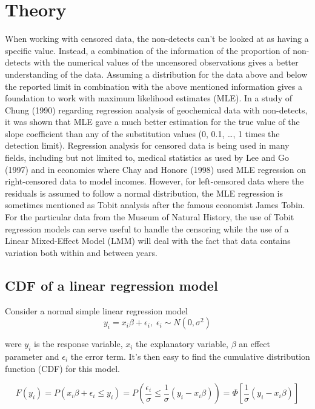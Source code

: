 \documentclass[]{article}
\begin{document}
\section{Theory}\label{theory}

When working with censored data, the non-detects can't be looked at as
having a specific value. Instead, a combination of the information of
the proportion of non-detects with the numerical values of the
uncensored observations gives a better understanding of the data.
Assuming a distribution for the data above and below the reported limit
in combination with the above mentioned information gives a foundation
to work with maximum likelihood estimates (MLE). In a study of Chung
(1990) regarding regression analysis of geochemical data with
non-detects, it was shown that MLE gave a much better estimation for the
true value of the slope coefficient than any of the substitution values
(0, 0.1, \ldots{}, 1 times the detection limit). Regression analysis for
censored data is being used in many fields, including but not limited
to, medical statistics as used by Lee and Go (1997) and in economics
where Chay and Honore (1998) used MLE regression on right-censored data
to model incomes. However, for left-censored data where the residuals is
assumed to follow a normal distribution, the MLE regression is sometimes
mentioned as Tobit analysis after the famous economist James Tobin. For
the particular data from the Museum of Natural History, the use of Tobit
regression models can serve useful to handle the censoring while the use
of a Linear Mixed-Effect Model (LMM) will deal with the fact that data
contains variation both within and between years.

\subsection{CDF of a linear regression
model}\label{cdf-of-a-linear-regression-model}

Consider a normal simple linear regression model \[
y_i = x_i \beta + \epsilon_i, \; \epsilon_i \sim N(0,\sigma^2)
\]

were \(y_i\) is the response variable, \(x_i\) the explanatory variable,
\(\beta\) an effect parameter and \(\epsilon_i\) the error term. It's
then easy to find the cumulative distribution function (CDF) for this
model.

\[
F(y_i) = P(x_i\beta+\epsilon_i\leq y_i) = P(\frac{\epsilon_i}{\sigma}\leq \frac{1}{\sigma}(y_i-x_i\beta)) = \Phi[\frac{1}{\sigma}(y_i-x_i\beta)]
\]
\end{document}
